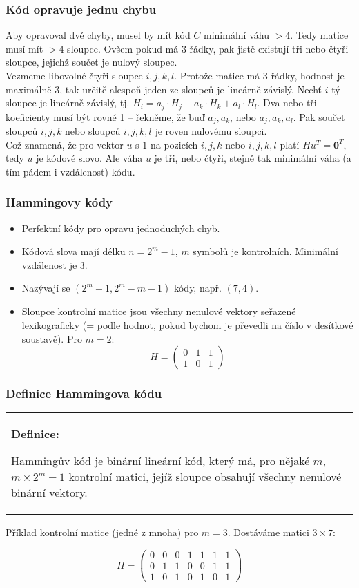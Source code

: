 \documentclass{beamer}
\newenvironment{definice}
{
    \begin{center}
    \begin{tabular}{p{9cm}}
    \textbf{Definice:}
}
{
    \end{tabular}
    \end{center}
}
\newcommand{\zero}{\textbf{0}}
\newcommand{\emptyline}{\\$\,$\\}
\newenvironment{itemizex}%
  {\large \begin{itemize}%
    \setlength{\itemsep}{8pt}%
    \setlength{\parskip}{8pt}}%
  {\end{itemize}}
\begin{document}
\begin{frame}[t,fragile]\frametitle{Kód opravuje jednu chybu} 
Aby opravoval dvě chyby, musel by mít kód $C$ minimální váhu $>4$. Tedy matice musí mít $>4$ sloupce. Ovšem pokud má 3 řádky, pak jistě existují tři nebo čtyři sloupce, jejichž součet je nulový sloupec.
\emptyline
Vezmeme libovolné čtyři sloupce $i, j, k, l$. Protože matice má 3 řádky, hodnost je maximálně 3, tak určitě alespoň jeden ze sloupců je lineárně závislý. Nechť $i$-tý sloupec je lineárně závislý, tj. $H_i=a_j\cdot H_j+a_k\cdot H_k+a_l\cdot H_l$. Dva nebo tři koeficienty musí být rovné 1 -- řekněme, že buď $a_j, a_k$, nebo $a_j, a_k, a_l$. Pak součet sloupců $i,j,k$ nebo sloupců $i,j,k,l$ je roven nulovému sloupci.
\emptyline
Což znamená, že pro vektor $u$ s $1$ na pozicích $i,j,k$ nebo $i,j,k,l$ platí $Hu^T=\zero^T$, tedy $u$ je kódové slovo. Ale váha $u$ je tři, nebo čtyři, stejně tak minimální váha (a tím pádem i vzdálenost) kódu. 
\end{frame}



\begin{frame}[t,fragile]\frametitle{Hammingovy kódy} 
    \begin{itemizex}
        \item Perfektní kódy pro opravu jednoduchých chyb.
        \item Kódová slova mají délku $n=2^m-1$, $m$ symbolů je kontrolních. Minimální vzdálenost je 3.
        \item Nazývají se $(2^m-1,2^m-m-1)$ kódy, např. $(7,4)$.
        \item Sloupce kontrolní matice jsou všechny nenulové vektory seřazené lexikograficky (= podle hodnot, pokud bychom je převedli na číslo v desítkové soustavě). Pro $m=2$:
$$
H=
\begin{pmatrix}
0&1&1\\
1&0&1
\end{pmatrix}
$$
    \end{itemizex}
\end{frame}


\begin{frame}[t,fragile]\frametitle{Definice Hammingova kódu} 
    \begin{definice}
Hammingův kód je binární lineární kód, který má, pro nějaké $m$, $m\times2^m-1$ kontrolní matici, jejíž sloupce obsahují všechny nenulové binární vektory. 
    \end{definice}

    Příklad kontrolní matice (jedné z mnoha) pro $m=3$. Dostáváme matici $3\times7$:

$$H=
\begin{pmatrix}
0&0&0&1&1&1&1\\
0&1&1&0&0&1&1\\
1&0&1&0&1&0&1
\end{pmatrix}$$
\end{frame}
\end{document}
